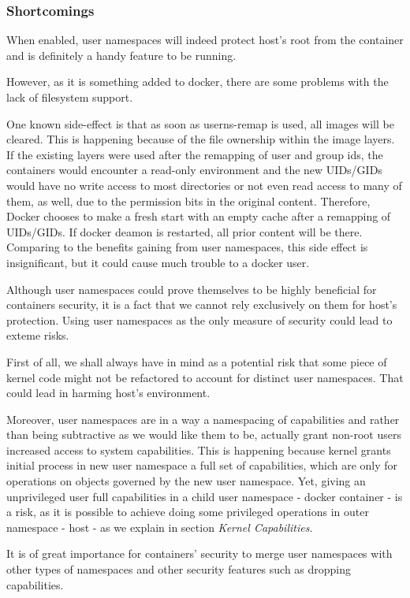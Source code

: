 \subsubsection{Shortcomings}
When enabled, user namespaces will indeed protect host's root from the container and is definitely a handy feature to be running.

However, as it is something  added to docker, there are some problems with the lack of filesystem support.

One known side-effect is that as soon as userns-remap is used, all images will be cleared. This is happening because of the file ownership within the image layers. If the existing layers were used after the remapping of user and group ids, the containers would encounter a read-only environment and the new UIDs/GIDs would have no write access to most directories or not even read access to many of them, as well, due to the permission bits in the original content. Therefore, Docker chooses to make a fresh start with an empty cache after a remapping of UIDs/GIDs. If docker deamon is restarted, all prior content will be there. Comparing to the benefits gaining from user namespaces, this side effect is insignificant, but it could cause much trouble to a docker user.

Although user namespaces could prove themselves to be highly beneficial for containers security, it is a fact that we cannot rely exclusively on them for host's protection. Using user namespaces as the only measure of security could lead to exteme risks.

First of all, we shall always have in mind as a potential risk that some piece of kernel code might not be refactored to account for distinct user namespaces. That could lead in harming host's environment.

Moreover, user namespaces are in a way a namespacing of capabilities and rather than being subtractive as we would like them to be, actually grant non-root users increased access to system capabilities. This is happening because kernel grants initial process in new user namespace a full set of capabilities, which are only for operations on objects governed by the new user namespace. Yet, giving an unprivileged user full capabilities in a child user namespace - docker container - is a risk, as it is possible to achieve doing some privileged operations in outer namespace - host - as we explain in section \textit{Kernel Capabilities}. \cite{usernsnotsosecure}

It is of great importance for containers' security to merge user namespaces with other types of namespaces and other security features such as dropping capabilities.

